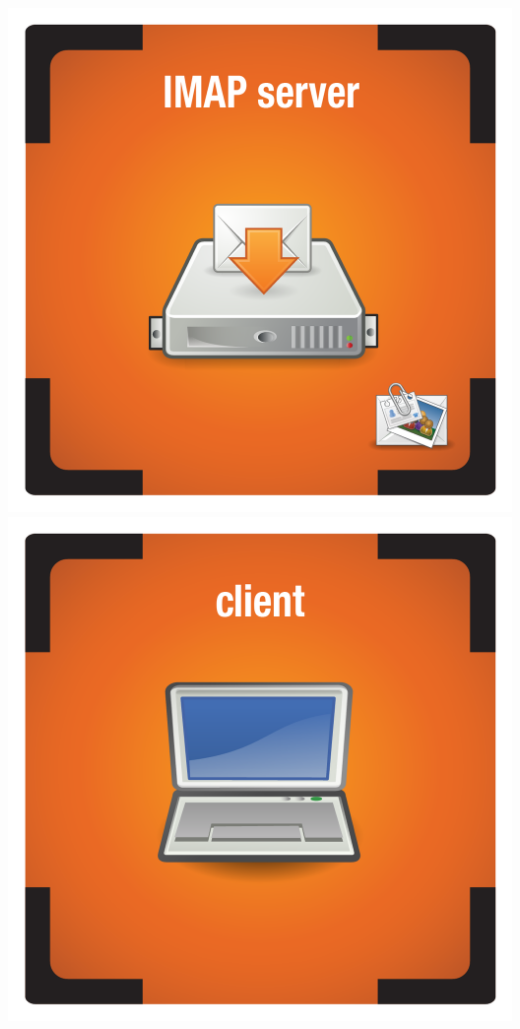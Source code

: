 \documentclass{letter}
\begin{document}
\includegraphics{tiles/node_imap_server_compromised}
\includegraphics{tiles/node_client_laptop_compromised} \\
\end{document}
